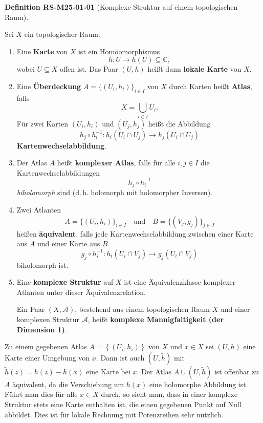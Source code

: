 \documentclass[10pt, letterpaper]{article}
\newcommand{\CustomHeading}[3]{%
  \par\medskip\noindent%
  \textbf{#1 #2} \textnormal{(#3)}.\enskip%
}
\newenvironment{DEF}[2]{\begin{unitbox}\CustomHeading{Definition}{#1}{#2}}{\end{unitbox}}
\begin{document}
\begin{DEF}{RS-M25-01-01}{Komplexe Struktur auf einem topologischen Raum}
Sei $X$ ein topologischer Raum.
\begin{enumerate}
\item Eine \textbf{Karte} von $X$ ist ein Homöomorphismus 
\[
h:U\longrightarrow h(U)\subseteq\mathbb{C},
\]
wobei $U\subseteq X$ offen ist. Das Paar $(U,h)$ heißt dann \textbf{lokale Karte} von $X$.

\item Eine \textbf{Überdeckung} $A=\{(U_i,h_i)\}_{i\in I}$ von $X$ durch Karten heißt \textbf{Atlas}, falls
\[
X=\bigcup_{i\in I}U_i.
\]
Für zwei Karten $(U_i,h_i)$ und $(U_j,h_j)$ heißt die Abbildung
\[
h_j\circ h_i^{-1}: h_i(U_i\cap U_j)\longrightarrow h_j(U_i\cap U_j)
\]
\textbf{Kartenwechselabbildung}.

\item Der Atlas $A$ heißt \textbf{komplexer Atlas}, falls für alle $i,j\in I$ die Kartenwechselabbildungen
\[
h_j\circ h_i^{-1}
\]
\emph{biholomorph} sind (d.\,h. holomorph mit holomorpher Inversen).

\item Zwei Atlanten 
\[
A=\{(U_i,h_i)\}_{i\in I}
\quad\text{und}\quad 
B=\{(V_j,g_j)\}_{j\in J}
\]
heißen \textbf{äquivalent}, falls jede Kartenwechselabbildung zwischen einer Karte aus $A$ und einer Karte aus $B$
\[
g_j\circ h_i^{-1}: h_i(U_i\cap V_j)\longrightarrow g_j(U_i\cap V_j)
\]
biholomorph ist.

\item Eine \textbf{komplexe Struktur} auf $X$ ist eine Äquivalenzklasse komplexer Atlanten unter dieser Äquivalenzrelation. 

Ein Paar $(X,\mathcal{A})$, bestehend aus einem topologischen Raum $X$ und einer komplexen Struktur $\mathcal{A}$, heißt \textbf{komplexe Mannigfaltigkeit (der Dimension 1)}.
\end{enumerate}
\end{DEF}



Zu einem gegebenen Atlas $A=\left\{\left(U_{i}, h_{i}\right)\right\}$ von $X$ und $x \in X$ sei $(U, h)$ eine Karte einer Umgebung von $x$. Dann ist auch $(U, \widetilde{h})$ mit $\widetilde{h}(z)=h(z)-h(x)$ eine Karte bei $x$. Der Atlas $A \cup(U, \widetilde{h})$ ist offenbar zu $A$ äquivalent, da die Verschiebung um $h(x)$ eine holomorphe Abbildung ist. Führt man dies für alle $x \in X$ durch, so sieht man, dass in einer komplexe Struktur stets eine Karte enthalten ist, die einen gegebenen Punkt auf Null abbildet. Dies ist für lokale Rechnung mit Potenzreihen sehr nützlich.
\end{document}
